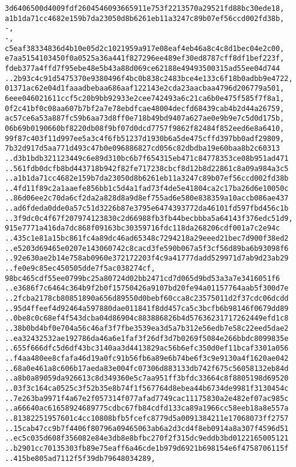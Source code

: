 \documentclass[
]{article}
\begin{document}
\begin{verbatim}
3d6406500d4009fdf2604546093665911e753f2213570a29521fd88bc30ede18,
a1b1da71cc4682e159b7da23050d8b6261eb11a3247c89b07ef56ccd002fd38b,
-,
-,
c5eaf38334836d4b10e05d2c1021959a917e08eaf4eb46a8c4c8d1bec04e2c00,
e7aa5154103450f0a0525a36a441f827296ee489ef30ed8787cff8df1bef223f,
fdeb377a4ffd7f95ebe48e5b43a88d069ce62188e49493500315ad55ee04d744
..2b93c4c91d5475370e9380496f4bc0b838c2483bce4e133c6f18b0adbb9e4722,
01371ac62e04d1faaadbebaa686aaf122143e2cda23aacbaa4796d206779a501,
6eee046021611ccf5c20b9bb92933e2cee742493a6c21ca6b0e475f585f7f8a1,
0f2c41bf0c08aa607b7bf2a7e78ebdfcae48004decfd68439cab4b2d44a26759,
ac57ce6a53a887fc59b6aa73d8ff0e718b49bd9407a627ae0e9b9e7c5d0d175b,
06b69b0190660bf8220db08f9bf07d0dcd7757f9862f82484f852eed6e8a6410,
99f87c403f11d997ee5a3c4f6fb51237d1930b6a5de475cffd397bb0adf29809,
7b32d917d5aa771d493c47b0e096886827cd056c82dbdba19e60baa8b2c60313
..d3b1bdb321123449c6e89d310bc6b7f654315eb471c84778353ce08b951ad471
..561fdb0dcfb8bd443718b942f82fe717238cbcf8d12b8d22861c8a09a984a3c5
..a1b1da71cc4682e159b7da23050d8b6261eb11a3247c89b07ef56ccd002fd38b
..4fd11f89c2a1aaefe856bb1c5d4a1fad73f4de5e41804ca2c17ba26d6e10050c
..86d06ee2c70da6cf2da2a828d8a9d8ef755ad6e580e838359a10accb086ae437
..ad6fdeda0dde0a57c51d3226b87e3795e6474393772da46101fd597fbd456c1b
..3f9dc0c4f67f207974123830c2d66988fb3fb44becbbba5a64143f376edc51d9,
915e7771a416da7dc868f09163bc30359716fdc118da268206cdf001a7c2e94c
..435c1e81a15bc861fc4a89dc46ad65348c7294218a29eeed21bec7d900f38ed2
..e5203d69465e0207e143060742c8cacd3fe590b067a5f3cf56d89ba6b93098f6
..92e630ae2b14e758ab0960e372172203f4c9a41777dadd529971d7ab9d23ab29
..fe0e9c85ec450505dde7f5ac038274cf,
98bc465cdf55ee0799bc25a80724d02bb2471cd7d065d9bd53a3a7e3416051f6
..e3686f7c6464c364b9f2b0f15750426a9107bd20fe94a01157764aab5f300d7e
..2fcba2178cb80851890a656d89550d0bebf60cca8c23575011d2f37cdc06dcdd
..95d4ffeef4d92464a597880dae011841f8dd457ca5c3bcfb6b98146f0679dd89
..0be8c0c68ef4f543dcba04d86904c883886826b4d57636231717262449efd1c8
..38b0bd4bf0e704a56c46af3f7fbe3539ea3d5a7b312e56edb7e58c22eed5dae2
..ea32432532ae192786da46a6e1faf3f26df3d7b0269f5084e266bbdc8099835e
..655f666dfc5d6df43bc3140aa3d4413829ac56b6efc350d0ef11bcaf3301a056
..f4aa480ee8cfafa46d19a0fc91b56fb6a89e6b74be6f3c9e9130a4f1620ae042
..68a0e461a8c606b17aeda83e004fc07306d883133db742f675c56058132eb84d
..a8b0a89059da926613c8d349360e5c7aa951ff3bfdc33664c8f8805198d69520
..03f3c164ca0525c3f52b35e8b74f1f567764d8ebea44b6734de9981f3130454c
..7e263ba9971f4a67e2f057314f077afad7749cac11175830a2e482ef07ac985c
..a66640ac61658924689775cdbc67fb84cdfd133ca89a1966cc58eeb18a8e557a
..81382251957601c4cc10808bfb5fcefc8779d5a0091384211e17068073ff2757
..15cab47cc9b7f4406f80796a09465063ab6a2d3cd4f8eb0914a8a307f4596d51
..ec5c035d608f356082e84e3db8e8bfbc270f2f315dc9eddb3bd0122165005121
..b2901cc70135303fb89e75eaff6a46cde1b979d6921b698154e6f4758706115f
..415be805ad7112f5f39db79648034289,
\end{verbatim}
\end{document}
